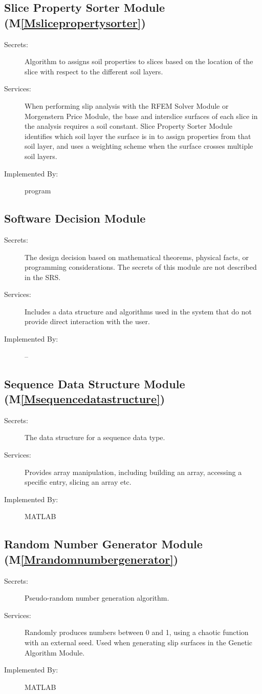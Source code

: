 \documentclass[12pt]{article}
\begin{document}
\subsection{Slice Property Sorter Module (M\ref{Mslicepropertysorter})}
\label{Sec:SPSM()}
\begin{description}
\item[Secrets:]Algorithm to assigns soil properties to slices based on the location of the slice with respect to the different soil layers.
\item[Services:]When performing slip analysis with the RFEM Solver Module or Morgenstern Price Module, the base and interslice surfaces of each slice in the analysis requires a soil constant. Slice Property Sorter Module identifies which soil layer the surface is in to assign properties from that soil layer, and uses a weighting scheme when the surface crosses multiple soil layers.
\item[Implemented By:]program
\end{description}
\subsection{Software Decision Module}
\label{Sec:SDM}
\begin{description}
\item[Secrets:]The design decision based on mathematical theorems, physical facts, or programming considerations. The secrets of this module are not described in the SRS.
\item[Services:]Includes a data structure and algorithms used in the system that do not provide direct interaction with the user.
\item[Implemented By:]--
\end{description}
\subsection{Sequence Data Structure Module (M\ref{Msequencedatastructure})}
\label{Sec:SDSM()}
\begin{description}
\item[Secrets:]The data structure for a sequence data type.
\item[Services:]Provides array manipulation, including building an array, accessing a specific entry, slicing an array etc.
\item[Implemented By:]MATLAB
\end{description}
\subsection{Random Number Generator Module (M\ref{Mrandomnumbergenerator})}
\label{Sec:RNGM()}
\begin{description}
\item[Secrets:]Pseudo-random number generation algorithm.
\item[Services:]Randomly produces numbers between 0 and 1, using a chaotic function with an external seed. Used when generating slip surfaces in the Genetic Algorithm Module.
\item[Implemented By:]MATLAB
\end{description}
\end{document}
